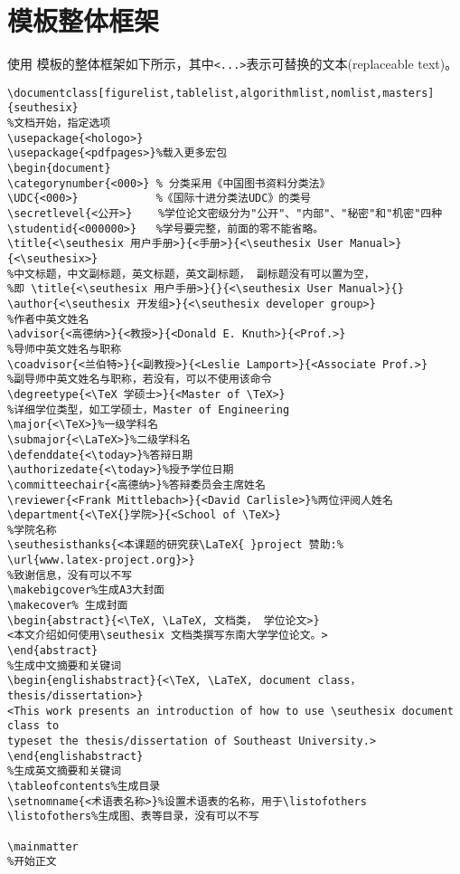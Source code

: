 \documentclass[figurelist,tablelist,algorithmlist,nomlist,masters]{seuthesix}
\begin{document}
\section{模板整体框架}
使用 \seuthesix 模板的整体框架如下所示，其中\verb+<...>+表示可替换的文本(replaceable text)。
{\color{magenta}
\begin{verbatim}
\documentclass[figurelist,tablelist,algorithmlist,nomlist,masters]{seuthesix}
%文档开始，指定选项
\usepackage{<hologo>}
\usepackage{<pdfpages>}%载入更多宏包
\begin{document}
\categorynumber{<000>} % 分类采用《中国图书资料分类法》
\UDC{<000>}            %《国际十进分类法UDC》的类号
\secretlevel{<公开>}    %学位论文密级分为"公开"、"内部"、"秘密"和"机密"四种
\studentid{<000000>}   %学号要完整，前面的零不能省略。
\title{<\seuthesix 用户手册>}{<手册>}{<\seuthesix User Manual>}{<\seuthesix>}
%中文标题，中文副标题，英文标题，英文副标题， 副标题没有可以置为空， 
%即 \title{<\seuthesix 用户手册>}{}{<\seuthesix User Manual>}{}
\author{<\seuthesix 开发组>}{<\seuthesix developer group>}
%作者中英文姓名
\advisor{<高德纳>}{<教授>}{<Donald E. Knuth>}{<Prof.>}
%导师中英文姓名与职称
\coadvisor{<兰伯特>}{<副教授>}{<Leslie Lamport>}{<Associate Prof.>} 
%副导师中英文姓名与职称，若没有，可以不使用该命令
\degreetype{<\TeX 学硕士>}{<Master of \TeX>} 
%详细学位类型，如工学硕士，Master of Engineering
\major{<\TeX>}%一级学科名
\submajor{<\LaTeX>}%二级学科名
\defenddate{<\today>}%答辩日期
\authorizedate{<\today>}%授予学位日期
\committeechair{<高德纳>}%答辩委员会主席姓名
\reviewer{<Frank Mittlebach>}{<David Carlisle>}%两位评阅人姓名
\department{<\TeX{}学院>}{<School of \TeX>}
%学院名称
\seuthesisthanks{<本课题的研究获\LaTeX{ }project 赞助:%
\url{www.latex-project.org}>}
%致谢信息，没有可以不写
\makebigcover%生成A3大封面
\makecover% 生成封面
\begin{abstract}{<\TeX, \LaTeX, 文档类， 学位论文>}
<本文介绍如何使用\seuthesix 文档类撰写东南大学学位论文。>
\end{abstract}
%生成中文摘要和关键词
\begin{englishabstract}{<\TeX, \LaTeX, document class， thesis/dissertation>}
<This work presents an introduction of how to use \seuthesix document class to 
typeset the thesis/dissertation of Southeast University.>
\end{englishabstract}
%生成英文摘要和关键词
\tableofcontents%生成目录
\setnomname{<术语表名称>}%设置术语表的名称，用于\listofothers
\listofothers%生成图、表等目录，没有可以不写

\mainmatter
%开始正文


\end{verbatim}}
\end{document}
